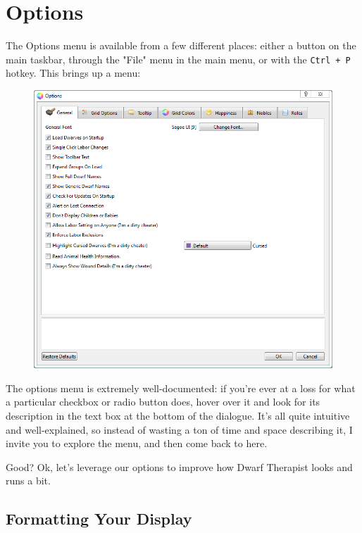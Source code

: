 \documentclass[]{article}
\begin{document}
\newpage
\section{Options}
\label{sec:Options}

The Options menu is available from a few different places: either a button on the main taskbar, through
the "File" menu in the main menu, or with the \texttt{Ctrl + P} hotkey. This brings up a menu:
\begin{figure}[h!] \centering
\vspace{-5pt}
\includegraphics[width=\linewidth]{Sec2Fig17}
\end{figure}

The options menu is extremely well-documented: if you're ever at a loss for what a particular checkbox
or radio button does, hover over it and look for its description in the text box at the bottom of the
dialogue. It's all quite intuitive and well-explained, so instead of wasting a ton of time and space
describing it, I invite you to explore the menu, and then come back to here.

Good? Ok, let's leverage our options to improve how Dwarf Therapist looks and runs a bit.

\newpage
\subsection{Formatting Your Display}
\label{sec:Formatting Your Display}
\end{document}
